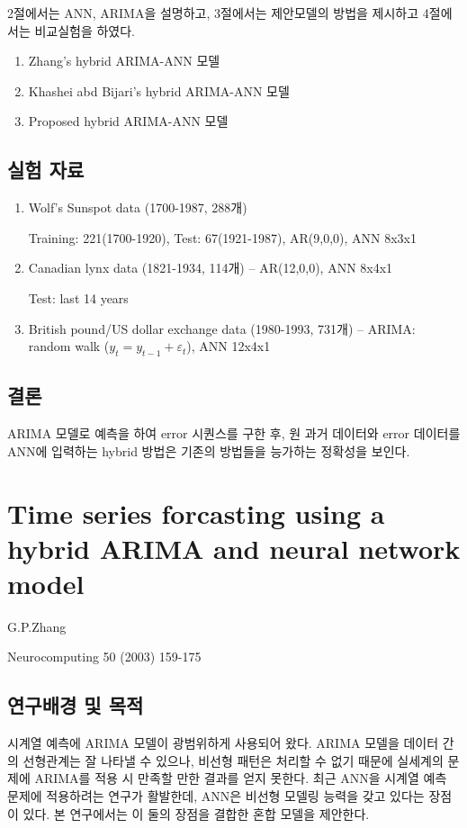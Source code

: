 \documentclass[ %
    a4paper,    %
    amsmath,    %
    itemph,     %
11pt]{oblivoir}     %
\begin{document}
2절에서는 ANN, ARIMA을 설명하고, 3절에서는 제안모델의 방법을 제시하고
4절에서는 비교실험을 하였다.

\begin{enumerate}\tightlist
\item Zhang's hybrid ARIMA-ANN 모델
\item Khashei abd Bijari's hybrid ARIMA-ANN 모델
\item Proposed hybrid ARIMA-ANN 모델
\end{enumerate}


\subsection{실험 자료}

\begin{enumerate}\tightlist
\item Wolf's Sunspot data (1700-1987, 288개) 

  Training: 221(1700-1920), Test: 67(1921-1987),  AR(9,0,0), ANN 8x3x1

\item Canadian lynx data (1821-1934, 114개) -- AR(12,0,0), ANN 8x4x1

  Test: last 14 years

\item British pound/US dollar exchange data (1980-1993, 731개) -- ARIMA: random walk ($y_t= y_{t-1} + \varepsilon_t$), ANN 12x4x1
\end{enumerate}


\subsection{결론}
ARIMA 모델로 예측을 하여 error 시퀀스를 구한 후, 원 과거 데이터와 error 데이터를 ANN에 입력하는 hybrid 방법은 기존의 방법들을 능가하는 정확성을 보인다.
 

\section{Time series forcasting using a hybrid ARIMA and neural network model\cite{zhang2003}}

\begin{description}\tightlist
\item[저자] G.P.Zhang
\item[학술지] Neurocomputing 50 (2003) 159-175
\end{description}

\subsection{연구배경 및 목적}
시계열 예측에 ARIMA 모델이 광범위하게 사용되어 왔다. ARIMA 모델을 데이터 간의 선형관계는 잘 나타낼 수 있으나, 비선형 패턴은 처리할 수 없기 때문에 실세계의 문제에 ARIMA를 적용 시 만족할 만한 결과를 얻지 못한다. 최근 ANN을 시계열 예측 문제에 적용하려는 연구가 활발한데, ANN은 비선형 모델링 능력을 갖고 있다는 장점이 있다. 본 연구에서는 이 둘의 장점을 결합한 혼합 모델을 제안한다.
\end{document}
